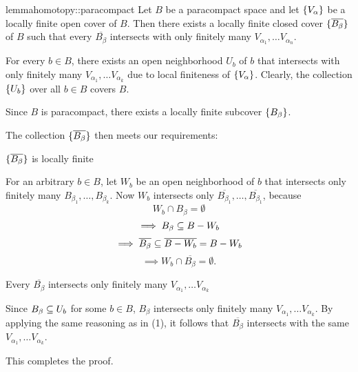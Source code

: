 \begin{mystatement}{lemma}{homotopy::paracompact}
    Let $B$ be a paracompact space and let $\{V_\alpha\}$
    be a locally finite open cover of $B$.
    Then there exists a locally finite closed cover $\{\overline{B_\beta}\}$ of $B$
    such that every $\overline{B_\beta}$ intersects with only
    finitely many $V_{\alpha_1}, \dots V_{\alpha_n}$.
\end{mystatement}

\begin{myproof}
    For every $b \in B$, there exists an open neighborhood $U_b$ of $b$
    that intersects with only finitely many
    $V_{\alpha_1}, \dots V_{\alpha_k}$
    due to local finiteness of $\{V_\alpha\}$.
    Clearly, the collection $\{U_b\}$ over all $b \in B$ covers $B$.

    Since $B$ is paracompact, there exists a locally finite subcover $\{B_\beta\}$.

    The collection $\{\overline{B_\beta}\}$ then meets our requirements:
    \begin{sectionize}
        \item $\{\overline{B_\beta}\}$ is locally finite
        
        For an arbitrary $b \in B$, let $W_b$
        be an open neighborhood of $b$ that
        intersects only finitely many $B_{\beta_1}, \dots, B_{\beta_k}$.
        Now $W_b$ intersects only
        $\overline{B_{\beta_1}}, \dots, \overline{B_{\beta_1}}$, because
        \[ W_b \cap B_\beta = \emptyset \]
        \[ \implies B_\beta \subseteq{} B - W_b \]
        \[ \implies \overline{B_\beta} \subseteq{} \overline{B - W_b} = B - W_b \]
        \[ \implies W_b \cap \overline{B_\beta} = \emptyset. \]

        \item Every $\overline{B_\beta}$ intersects
        only finitely many $V_{\alpha_1}, \dots V_{\alpha_k}$
        
        Since $B_\beta \subseteq{} U_b$ for some $b \in B$, $B_\beta$
        intersects only finitely many $V_{\alpha_1}, \dots V_{\alpha_k}$.
        By applying the same reasoning as in (1),
        it follows that $\overline{B_\beta}$ intersects
        with the same $V_{\alpha_1}, \dots V_{\alpha_k}$.
    \end{sectionize}
    This completes the proof.
\end{myproof}